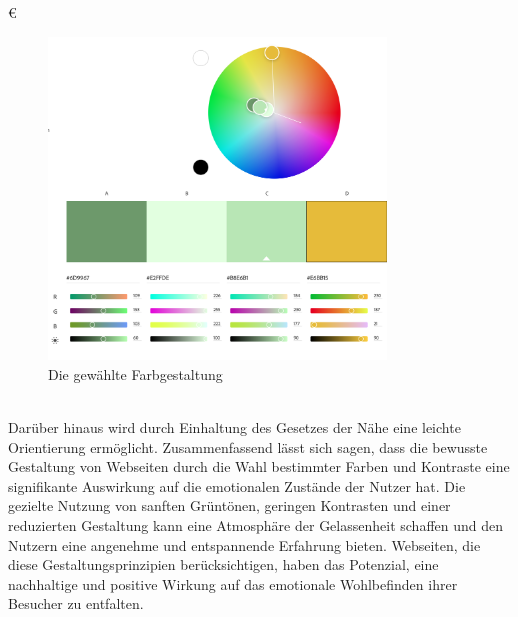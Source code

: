 €\documentclass[./dokumentation.tex]{subfiles}
\begin{document}
\begin{figure}[H]
    \centering
    \includegraphics[width=0.8\textwidth]{bilder/adobecolor.png}
    \caption{Die gewählte Farbgestaltung}
    \label{fig22:adobecolor}
\end{figure}\\

Darüber hinaus wird durch Einhaltung des Gesetzes der Nähe eine leichte Orientierung ermöglicht.  Zusammenfassend lässt sich sagen, dass die bewusste Gestaltung von Webseiten durch die Wahl bestimmter Farben und Kontraste eine signifikante Auswirkung auf die emotionalen Zustände der Nutzer hat. Die gezielte Nutzung von sanften Grüntönen, geringen Kontrasten und einer reduzierten Gestaltung kann eine Atmosphäre der Gelassenheit schaffen und den Nutzern eine angenehme und entspannende Erfahrung bieten. Webseiten, die diese Gestaltungsprinzipien berücksichtigen, haben das Potenzial, eine nachhaltige und positive Wirkung auf das emotionale Wohlbefinden ihrer Besucher zu entfalten.\\
\end{document}
